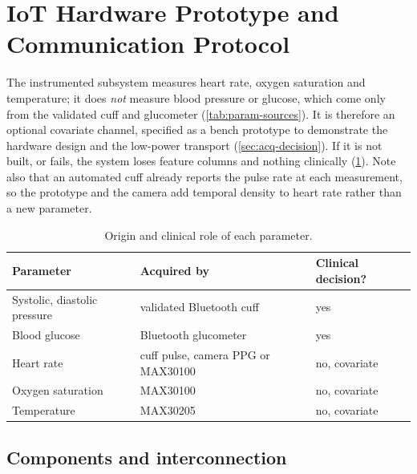 
\section{IoT Hardware Prototype and Communication Protocol}\label{sec:iot}\label{sec:iot-scope}

The instrumented subsystem measures heart rate, oxygen saturation and temperature; it does \emph{not} measure blood pressure or glucose, which come only from the validated cuff and glucometer (\cref{tab:param-sources}). It is therefore an optional covariate channel, specified as a bench prototype to demonstrate the hardware design and the low-power transport (\cref{sec:acq-decision}). If it is not built, or fails, the system loses feature columns and nothing clinically (\cref{tab:parameter-provenance}). Note also that an automated cuff already reports the pulse rate at each measurement, so the prototype and the camera add temporal density to heart rate rather than a new parameter.

\begin{table}[htbp]
\centering\small
\caption{Origin and clinical role of each parameter.}\label{tab:parameter-provenance}
\begin{tabularx}{\textwidth}{@{}>{\raggedright\arraybackslash}p{3.8cm} X >{\raggedright\arraybackslash}p{3.4cm}@{}}
\toprule
\textbf{Parameter} & \textbf{Acquired by} & \textbf{Clinical decision?} \\
\midrule
Systolic, diastolic pressure & validated Bluetooth cuff & yes \\
Blood glucose & Bluetooth glucometer & yes \\
Heart rate & cuff pulse, camera PPG or MAX30100 & no, covariate \\
Oxygen saturation & MAX30100 & no, covariate \\
Temperature & MAX30205 & no, covariate \\
\bottomrule
\end{tabularx}
\end{table}

\subsection{Components and interconnection}\label{sec:components}\label{sec:interconnect}\label{sec:pinout}

